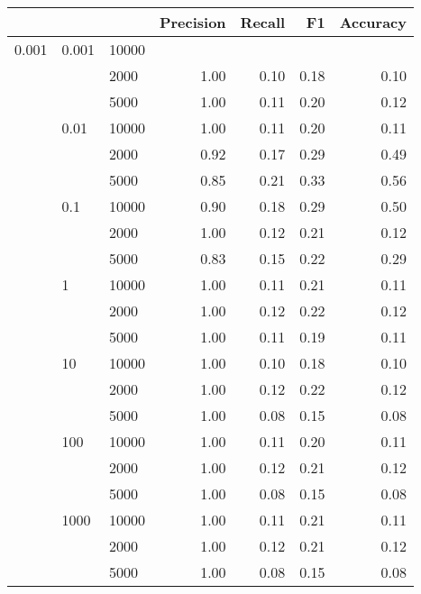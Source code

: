 \begin{tabular}{lllrrrr}
\toprule
      &       &       &  Precision &     Recall &         F1 &   Accuracy \\
\midrule
0.001 & 0.001 & 10000 &            &            &            &            \\
      &       & 2000 &       1.00 &       0.10 &       0.18 &       0.10 \\
      &       & 5000 &       1.00 &       0.11 &       0.20 &       0.12 \\
      & 0.01 & 10000 &       1.00 &       0.11 &       0.20 &       0.11 \\
      &       & 2000 &       0.92 &       0.17 &       0.29 &       0.49 \\
      &       & 5000 &       0.85 &       0.21 &       0.33 &       0.56 \\
      & 0.1 & 10000 &       0.90 &       0.18 &       0.29 &       0.50 \\
      &       & 2000 &       1.00 &       0.12 &       0.21 &       0.12 \\
      &       & 5000 &       0.83 &       0.15 &       0.22 &       0.29 \\
      & 1 & 10000 &       1.00 &       0.11 &       0.21 &       0.11 \\
      &       & 2000 &       1.00 &       0.12 &       0.22 &       0.12 \\
      &       & 5000 &       1.00 &       0.11 &       0.19 &       0.11 \\
      & 10 & 10000 &       1.00 &       0.10 &       0.18 &       0.10 \\
      &       & 2000 &       1.00 &       0.12 &       0.22 &       0.12 \\
      &       & 5000 &       1.00 &       0.08 &       0.15 &       0.08 \\
      & 100 & 10000 &       1.00 &       0.11 &       0.20 &       0.11 \\
      &       & 2000 &       1.00 &       0.12 &       0.21 &       0.12 \\
      &       & 5000 &       1.00 &       0.08 &       0.15 &       0.08 \\
      & 1000 & 10000 &       1.00 &       0.11 &       0.21 &       0.11 \\
      &       & 2000 &       1.00 &       0.12 &       0.21 &       0.12 \\
      &       & 5000 &       1.00 &       0.08 &       0.15 &       0.08 \\

\end{tabular}
